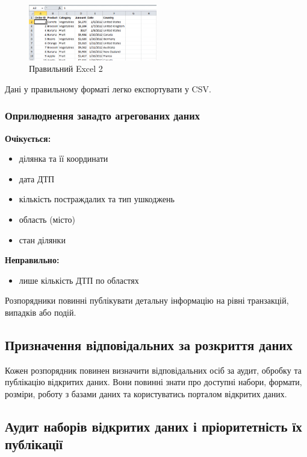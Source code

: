 \begin{figure}[h]
    \centering
    \includegraphics[width=0.5\textwidth]{images/007.gif}
    \caption{Правильний Excel 2}
\end{figure}

Дані у правильному форматі легко експортувати у CSV.

\subsubsection{Оприлюднення занадто агрегованих даних}

\textbf{Очікується:}  
\begin{itemize}
    \item ділянка та її координати  
    \item дата ДТП  
    \item кількість постраждалих та тип ушкоджень  
    \item область (місто)  
    \item стан ділянки
\end{itemize}

\textbf{Неправильно:}  
\begin{itemize}
    \item лише кількість ДТП по областях
\end{itemize}

Розпорядники повинні публікувати детальну інформацію на рівні транзакцій, випадків або подій.

\subsection{Призначення відповідальних за розкриття даних}

Кожен розпорядник повинен визначити відповідальних осіб за аудит, обробку та публікацію відкритих даних. Вони повинні знати про доступні набори, формати, розміри, роботу з базами даних та користуватись порталом відкритих даних.

\subsection{Аудит наборів відкритих даних і пріоритетність їх публікації}

